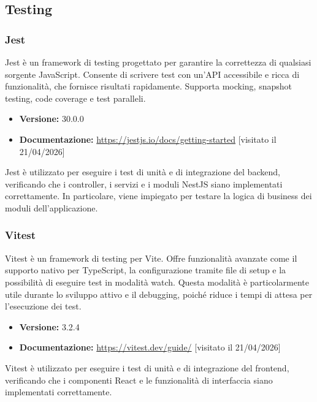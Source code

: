 \documentclass[a4paper, 11pt]{article}
\begin{document}
\subsection{Testing}

\subsubsection{Jest}
Jest è un framework di testing progettato per garantire la correttezza di qualsiasi sorgente JavaScript. Consente di scrivere test con un'API accessibile e ricca di funzionalità, che fornisce risultati rapidamente. Supporta mocking, snapshot testing, code coverage e test paralleli.
\begin{itemize}
  \item \textbf{Versione:} 30.0.0
  \item \textbf{Documentazione:} \url{https://jestjs.io/docs/getting-started} [visitato il 21/04/2026]
\end{itemize}
Jest è utilizzato per eseguire i test di unità e di integrazione del backend, verificando che i controller, i servizi e i moduli NestJS siano implementati correttamente. In particolare, viene impiegato per testare la logica di business dei moduli dell'applicazione.

\subsubsection{Vitest}
Vitest è un framework di testing per Vite. Offre funzionalità avanzate come il supporto nativo per TypeScript, la configurazione tramite file di setup e la possibilità di eseguire test in modalità watch. Questa modalità è particolarmente utile durante lo sviluppo attivo e il debugging, poiché riduce i tempi di attesa per l'esecuzione dei test.
\begin{itemize}
  \item \textbf{Versione:} 3.2.4
  \item \textbf{Documentazione:} \url{https://vitest.dev/guide/} [visitato il 21/04/2026]
\end{itemize}
Vitest è utilizzato per eseguire i test di unità e di integrazione del frontend, verificando che i componenti React e le funzionalità di interfaccia siano implementati correttamente.

\end{document}
